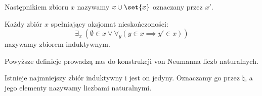 \begin{definition}[Następnik]
    Następnikiem zbioru \( x \) nazywamy \( x \cup \set{x} \) oznaczany przez \( x' \).
\end{definition}

\begin{definition}
    Każdy zbiór \( x \) spełniający aksjomat nieskończoności:
    \[
        \exists_x \ (\emptyset \in x \lor \forall_y (y \in x \implies y' \in x))
    \]
    nazywamy zbiorem induktywnym.
\end{definition}

Powyższe definicje prowadzą nas do konstrukcji von Neumanna liczb naturalnych.
\begin{definition}
    Istnieje najmniejszy zbiór induktywny i jest on jedyny. Oznaczamy go przez \( \natural \), a jego elementy nazywamy liczbami naturalnymi.
\end{definition}

